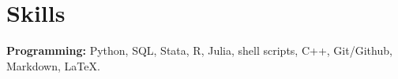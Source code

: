 
\section*{Skills} 
  \resumeSubHeadingListStart
    \small{\item{
        \textbf{Programming: }{Python, SQL, Stata, R, Julia, shell scripts,
        C++, Git/Github, Markdown, \LaTeX.} \\[3pt]
        
    }}
  \resumeSubHeadingListEnd


